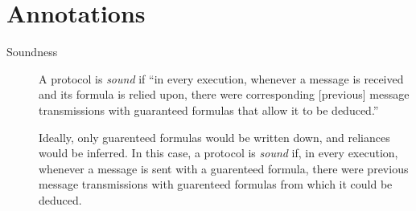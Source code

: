\documentclass{article}
\begin{document}
\section{Annotations}

\begin{description}

\item[Soundness]
A protocol is \emph{sound} if ``in every execution, whenever a message
is received and its formula is relied upon, there were corresponding
[previous] message transmissions with guaranteed formulas that allow
it to be deduced.''

Ideally, only guarenteed formulas would be written down, and
reliances would be inferred. In this case, a protocol is \emph{sound}
if, in every execution, whenever a message is sent with a guarenteed
formula, there were previous message transmissions with guarenteed
formulas from which it could be deduced.

\end{description}
\end{document}
